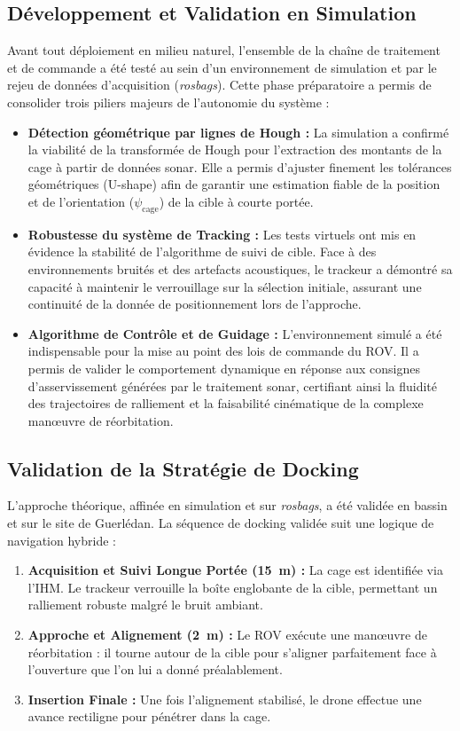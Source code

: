 \subsection{Développement et Validation en Simulation}

Avant tout déploiement en milieu naturel, l'ensemble de la chaîne de traitement et de commande a été testé au sein d'un environnement de simulation et par le rejeu de données d'acquisition (\textit{rosbags}). Cette phase préparatoire a permis de consolider trois piliers majeurs de l'autonomie du système :

\begin{itemize}
    \item \textbf{Détection géométrique par lignes de Hough :} La simulation a confirmé la viabilité de la transformée de Hough pour l'extraction des montants de la cage à partir de données sonar. Elle a permis d'ajuster finement les tolérances géométriques (U-shape) afin de garantir une estimation fiable de la position et de l'orientation ($\psi_{\text{cage}}$) de la cible à courte portée.
    \item \textbf{Robustesse du système de Tracking :} Les tests virtuels ont mis en évidence la stabilité de l'algorithme de suivi de cible. Face à des environnements bruités et des artefacts acoustiques, le trackeur a démontré sa capacité à maintenir le verrouillage sur la sélection initiale, assurant une continuité de la donnée de positionnement lors de l'approche.
    \item \textbf{Algorithme de Contrôle et de Guidage :} L'environnement simulé a été indispensable pour la mise au point des lois de commande du ROV. Il a permis de valider le comportement dynamique en réponse aux consignes d'asservissement générées par le traitement sonar, certifiant ainsi la fluidité des trajectoires de ralliement et la faisabilité cinématique de la complexe manœuvre de réorbitation.
\end{itemize}

\subsection{Validation de la Stratégie de Docking}

L'approche théorique, affinée en simulation et sur \textit{rosbags}, a été validée en bassin et sur le site de Guerlédan. La séquence de docking validée suit une logique de navigation hybride :

\begin{enumerate}
    \item \textbf{Acquisition et Suivi Longue Portée (15~m) :} La cage est identifiée via l'IHM. Le trackeur verrouille la boîte englobante de la cible, permettant un ralliement robuste malgré le bruit ambiant.
    \item \textbf{Approche et Alignement (2~m) :} Le ROV exécute une manœuvre de réorbitation : il tourne autour de la cible pour s'aligner parfaitement face à l'ouverture que l'on lui a donné préalablement.
    \item \textbf{Insertion Finale :} Une fois l'alignement stabilisé, le drone effectue une avance rectiligne pour pénétrer dans la cage.
\end{enumerate}

